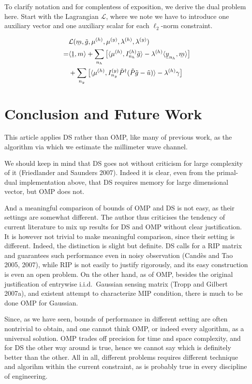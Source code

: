 \documentclass[12pt]{article}
\newcommand{\MC}[1]{\mathcal{#1}}
\newcommand{\T}[1]{\tilde{#1}}
\newcommand{\V}[1]{\stackunder[1.2pt]{$#1$}{\rule{.9ex}{.075ex}}}
\newcommand{\LA}{\langle}
\newcommand{\RA}{\rangle}
\begin{document}
To clarify notation and for complentess of exposition, we derive the dual problem here.
Start with the Lagrangian \(\MC{L}\), where we note we have to introduce one auxiliary vector and one auxiliary scalar for each \(\ell_2\)-norm constraint.

\begin{align}
   &\MC{L}(\V{m}, \T{g}, \mu^{(h)}, \mu^{(y)}, \lambda^{(h)}, \lambda^{(y)}) \notag \\
=& \LA \V{1}, m \RA 
   +\sum_{n_h} \big[ \LA \mu^{(h)}, I_{n_h}^{(h)} \T{g} \RA -\lambda^{(h)} \LA \V{y}_{n_h}, \V{m} \RA \big] \notag \\
\quad & +\sum_{n_y} \big[ \LA \mu^{(h)}, I_{n_y}^{(y)} \T{P}^\dagger ( \T{P} \T{g} -\T{u} ) \RA -\lambda^{(h)} \gamma \big]
\end{align}


\section{Conclusion and Future Work}

This article applies DS rather than OMP, like many of previous work, as the algorithm via which we estimate the millimeter wave channel.

We should keep in mind that DS goes not without criticism for large complexity of it (Friedlander and Saunders 2007).
Indeed it is clear, even from the primal-dual implementation above, that DS requires memory for large dimensional vector, but OMP does not.

And a meaningful comparison of bounds of OMP and DS is not easy, as their settings are somewhat different.
The author thus criticises the tendency of current literature to mix up results for DS and OMP without clear justification.
It is however not trivial to make meaningful comparison, since their setting is different.
Indeed, the distinction is slight but definite.
DS calls for a RIP matrix and guarantees such performance even in noisy observation (Cand\`es and Tao 2005, 2007), while RIP is not easily to justify rigorously, and its easy construction is even an open problem.
On the other hand, as of OMP, besides the original justification of entrywise i.i.d.\ Gaussian sensing matrix (Tropp and Gilbert 2007a), and existent attempt to characterize MIP condition, there is much to be done OMP for Gaussian.

Since, as we have seen, bounds of performance in different setting are often nontrivial to obtain, and one cannot think OMP, or indeed every algorithm, as a universal solution.
OMP trades off precision for time and space complexity, and for DS the other way around is true, hence we cannot say which is definitely better than the other.
All in all, different problems requires different technique and algorihm within the current constraint, as is probably true in every discipline of engineering.
\end{document}
